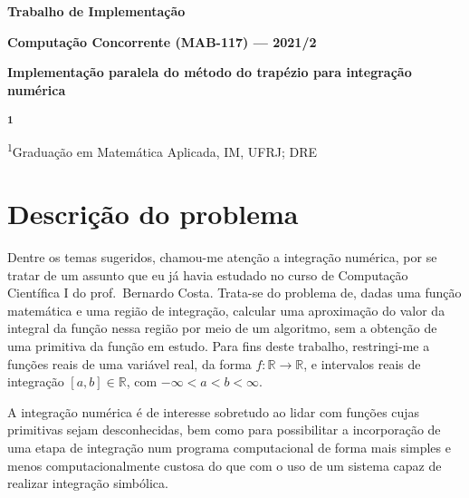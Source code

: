 \documentclass{article}
\newcommand{\R}{\mathbb{R}}
\begin{document}
\begin{center}
  \begin{Large}
    \textbf{Trabalho de Implementação}
  \end{Large}

  \vspace{8pt}

  \begin{large}
    \textbf{Computação Concorrente (MAB-117) — 2021/2}
  \end{large}

  \vspace{8pt}

  \begin{Large}
    \textbf{Implementação paralela do método do trapézio para integração numérica}
  \end{Large}

  \vspace{12pt}

  \begin{large}
    \textbf{\fullname\textsuperscript{1}}  %

    \vspace{5pt}

    \textsuperscript{1}Graduação em Matemática Aplicada, IM, UFRJ; DRE \DRE %
  \end{large}

\end{center}

  \section{Descrição do problema}

  Dentre os temas sugeridos, chamou-me atenção a integração numérica, por se tratar de um assunto que eu já havia estudado no curso de Computação Científica I do prof.\ Bernardo Costa\cite{cci}. Trata-se do problema de, dadas uma função matemática e uma região de integração, calcular uma aproximação do valor da integral da função nessa região por meio de um algoritmo, sem a obtenção de uma primitiva da função em estudo. Para fins deste trabalho, restringi-me a funções reais de uma variável real, da forma $f: \R \to \R$, e intervalos reais de integração $[a, b] \in \R$, com $-\infty < a < b < \infty$.

  A integração numérica é de interesse sobretudo ao lidar com funções cujas primitivas sejam desconhecidas, bem como para possibilitar a incorporação de uma etapa de integração num programa computacional de forma mais simples e menos computacionalmente custosa do que com o uso de um sistema capaz de realizar integração simbólica.
  
\end{document}
